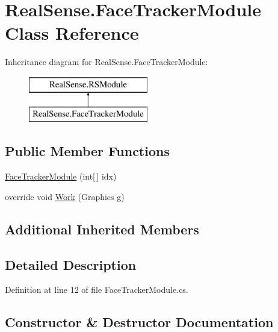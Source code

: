 \hypertarget{class_real_sense_1_1_face_tracker_module}{}\section{Real\+Sense.\+Face\+Tracker\+Module Class Reference}
\label{class_real_sense_1_1_face_tracker_module}
Inheritance diagram for Real\+Sense.\+Face\+Tracker\+Module\+:\begin{figure}[H]
\begin{center}
\leavevmode
\includegraphics[height=2.000000cm]{class_real_sense_1_1_face_tracker_module}
\end{center}
\end{figure}
\subsection*{Public Member Functions}
\begin{DoxyCompactItemize}
\item 
\hyperlink{class_real_sense_1_1_face_tracker_module_ac34dc667e54a0a222f750f27f71734c4}{Face\+Tracker\+Module} (int\mbox{[}$\,$\mbox{]} idx)
\item 
override void \hyperlink{class_real_sense_1_1_face_tracker_module_a38b7097ab671999aae5f1a645fc623f8}{Work} (Graphics g)
\end{DoxyCompactItemize}
\subsection*{Additional Inherited Members}


\subsection{Detailed Description}


Definition at line 12 of file Face\+Tracker\+Module.\+cs.



\subsection{Constructor \& Destructor Documentation}
\mbox{\label{class_real_sense_1_1_face_tracker_module_ac34dc667e54a0a222f750f27f71734c4}} 
